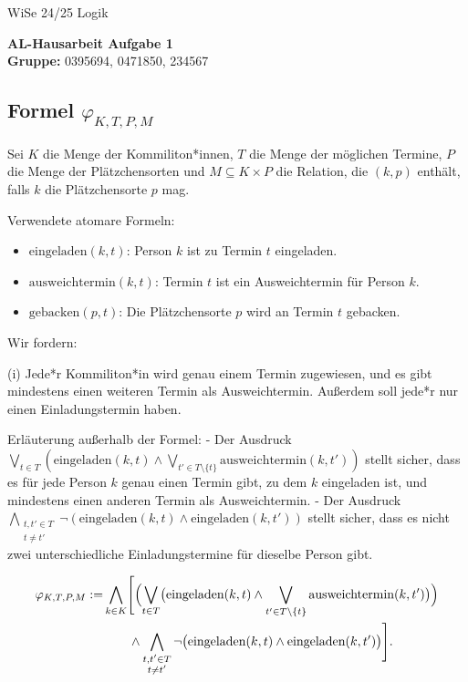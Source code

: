 \documentclass[12pt,a4paper]{article}
\begin{document}
\noindent
\noindent \large WiSe 24/25 \hfill
Logik

\begin{center}
\textbf{AL-Hausarbeit  Aufgabe 1}\\
\vspace*{0.5cm}
\textbf{Gruppe:} 0395694, 0471850, 234567 %

\end{center}

\subsection*{Formel $\varphi_{K,T,P,M}$}

Sei $K$ die Menge der Kommiliton*innen, $T$ die Menge der möglichen Termine, 
$P$ die Menge der Plätzchensorten und $M \subseteq K \times P$ die Relation, 
die $(k,p)$ enthält, falls $k$ die Plätzchensorte $p$ mag.

Verwendete atomare Formeln:
\begin{itemize}
    \item $\text{eingeladen}(k,t)$: Person $k$ ist zu Termin $t$ eingeladen.
    \item $\text{ausweichtermin}(k,t)$: Termin $t$ ist ein Ausweichtermin für Person $k$.
    \item $\text{gebacken}(p,t)$: Die Plätzchensorte $p$ wird an Termin $t$ gebacken.
\end{itemize}

Wir fordern:

(i) Jede*r Kommiliton*in wird genau einem Termin zugewiesen, und es gibt mindestens einen weiteren Termin als Ausweichtermin. Außerdem soll jede*r nur einen Einladungstermin haben.

Erläuterung außerhalb der Formel:  
- Der Ausdruck $\bigvee_{t \in T}(\text{eingeladen}(k,t) \wedge \bigvee_{t' \in T\setminus\{t\}}\text{ausweichtermin}(k,t'))$ stellt sicher, dass es für jede Person $k$ genau einen Termin gibt, zu dem $k$ eingeladen ist, und mindestens einen anderen Termin als Ausweichtermin.  
- Der Ausdruck $\bigwedge_{\substack{t,t' \in T \\ t \neq t'}} \neg(\text{eingeladen}(k,t)\wedge\text{eingeladen}(k,t'))$ stellt sicher, dass es nicht zwei unterschiedliche Einladungstermine für dieselbe Person gibt.

\begin{align*}
\varphi_{K,T,P,M} := 
& \bigwedge_{k \in K}\Biggl[
   \Bigl(
     \bigvee_{t \in T}\bigl(\text{eingeladen}(k,t) \wedge \bigvee_{t' \in T\setminus\{t\}} \text{ausweichtermin}(k,t')\bigr)
   \Bigr) \\
& \qquad\wedge
   \bigwedge_{\substack{t,t' \in T \\ t \neq t'}} 
     \neg\bigl(\text{eingeladen}(k,t)\wedge \text{eingeladen}(k,t')\bigr)
\Biggr].
\end{align*}
\end{document}
